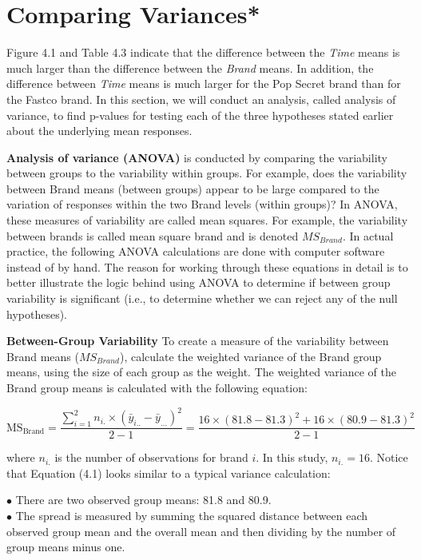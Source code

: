 \documentclass[
]{report}
\begin{document}
\section{Comparing Variances*}\label{comparing-variances}

Figure 4.1 and Table 4.3 indicate that the difference between the \emph{Time} means is much larger than the difference between the \emph{Brand} means. In addition, the difference between \emph{Time} means is much larger for the Pop Secret brand than for the Fastco brand. In this section, we will conduct an analysis, called analysis of variance, to find p-values for testing each of the three hypotheses stated earlier about the underlying mean responses.

\textbf{Analysis of variance (ANOVA)} is conducted by comparing the variability between groups to the variability within groups. For example, does the variability between Brand means (between groups) appear to be large compared to the variation of responses within the two Brand levels (within groups)? In ANOVA, these measures of variability are called mean squares. For example, the variability between brands is called mean square brand and is denoted \(MS_{Brand}\). In actual practice, the following ANOVA calculations are done
with computer software instead of by hand. The reason for working through these equations in detail is to
better illustrate the logic behind using ANOVA to determine if between group variability is significant (i.e.,
to determine whether we can reject any of the null hypotheses).

\textbf{Between-Group Variability} To create a measure of the variability between Brand means (\(MS_{Brand}\)), calculate the weighted variance of the Brand group means, using the size of each group as the weight. The weighted variance of the Brand group means is calculated with the following equation:

\begin{equation}
\mathrm{MS}_{\mathrm{Brand}}
= \frac{\sum_{i=1}^2 n_{i.} \times (\bar y_{i..} - \bar y_{...})^2}{2 - 1}
= \frac{16\times(81.8 - 81.3)^2 + 16\times(80.9 - 81.3)^2}{2 - 1}
\tag{4.1}
\end{equation}

where \(n_{i.}\) is the number of observations for brand \(i\). In this study, \(n_{i.} = 16\). Notice that Equation (4.1) looks similar to a typical variance calculation:

\(\bullet\) There are two observed group means: 81.8 and 80.9.\\
\(\bullet\) The spread is measured by summing the squared distance between each observed group mean and the overall mean and then dividing by the number of group means minus one.
\end{document}
